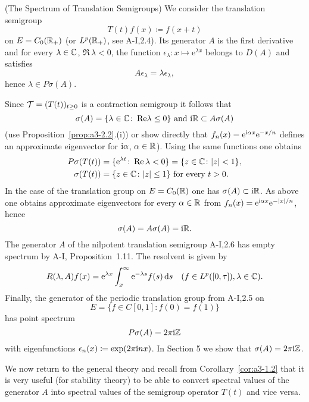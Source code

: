 \begin{example}{(The Spectrum of Translation Semigroups)}\label{ex:a3-2.4}%
We consider the translation semigroup
\[
T(t)f(x) \coloneqq f(x+t)
\]
on $E = C_{0}(\mathbb{R}_{+})$ (or $L^{p}(\mathbb{R}_{+})$, see A-I,2.4).
Its generator $A$ is the first derivative and for every $\lambda \in \mathbb{C}$, $\Re\,\lambda < 0$, the function $\epsilon_{\lambda} \colon x \mapsto \mathrm{e}^{\lambda x}$ belongs to $D(A)$ and satisfies
\[
A\epsilon_{\lambda} = \lambda\epsilon_{\lambda} ,
\]
hence $\lambda \in P\sigma(A)$.

Since $\mathcal{T} = (T(t))_{t \geq 0}$ is a contraction semigroup it follows that 
%
\[
	 \text{$\sigma(A) = \{\lambda \in \mathbb{C} \colon \mathop{}\!\mathrm{Re}\lambda \leq 0\}$  and $\mathrm{i}\mathbb{R} \subset A\sigma(A)$}  
\]
%
(use Proposition~\ref{prop:a3-2.2}.(i)) or show directly that $f_{n}(x) = \mathrm{e}^{ \mathrm{i}\alpha x}\mathrm{e}^{-x/n}$ defines an approximate eigenvector for $\mathrm{i}\alpha$, $\alpha \in \mathbb{R}$).
Using the same functions one obtains
\begin{align*}
	P\sigma(T(t)) &= \{\mathrm{e}^{\lambda t} \colon \mathop{}\!\mathrm{Re}\,\lambda < 0\} = \{z \in \mathbb{C} \colon |z| < 1\} ,\\
	\sigma(T(t)) &= \{z \in \mathbb{C} \colon |z| \leq 1\} \text{ for every } t > 0 .
\end{align*}
In the case of the translation group on $E = C_{0}(\mathbb{R})$ one has $\sigma(A) \subset \mathrm{i}\mathbb{R}$.
As above one obtains approximate eigenvectors for every $\alpha \in \mathbb{R}$ from 
$f_{n}(x) = \mathrm{e}^{\mathrm{i}\alpha x}\mathrm{e}^{-|x|/n}$, hence
\[
\sigma(A) = A\sigma(A) = \mathrm{i}\mathbb{R} .
\]
The generator $A$ of the nilpotent translation semigroup A-I,2.6 has empty spectrum by A-I, Proposition~1.11.
The resolvent is given by
\[
R(\lambda,A)f(x) = \mathrm{e}^{\lambda x}\int_{x}^{\infty}\mathrm{e}^{-\lambda s}f(s)  \mathop{}\!\mathrm{d}{s} \quad (f \in L^{p}([0,\tau]), \lambda \in \mathbb{C}) .
\]
Finally, the generator of the periodic translation group from A-I,2.5 on
\[
	E = \{f \in C[0,1] \colon f(0) = f(1)\}
\]
%
has point spectrum
\[
P\sigma(A) = 2\pi \mathrm{i}\mathbb{Z}
\]
with eigenfunctions $\epsilon_{n}(x) \coloneqq \exp(2\pi \mathrm{i} n x)$.
In Section 5 we show that $\sigma(A) = 2\pi \mathrm{i}\mathbb{Z}$.
\end{example}
We now return to the general theory and recall from Corollary~\ref{cor:a3-1.2} that it is very useful (\eg for stability theory) to be able to convert
spectral values of the generator $A$ into spectral values of the semigroup operator $T(t)$ and vice versa.
